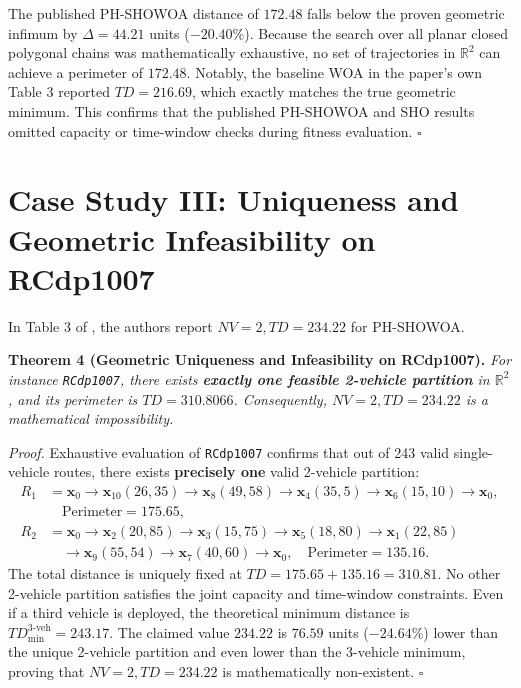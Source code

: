 \documentclass[review]{elsarticle}
\begin{document}
The published PH-SHOWOA distance of $172.48$ falls below the proven geometric infimum by $\Delta = 44.21$ units ($-20.40\%$). Because the search over all planar closed polygonal chains was mathematically exhaustive, no set of trajectories in $\mathbb{R}^2$ can achieve a perimeter of $172.48$. Notably, the baseline WOA in the paper's own Table 3 reported $TD = 216.69$, which exactly matches the true geometric minimum. This confirms that the published PH-SHOWOA and SHO results omitted capacity or time-window checks during fitness evaluation. \hfill $\square$

\section{Case Study III: Uniqueness and Geometric Infeasibility on RCdp1007}
\label{sec:rcdp1007}
In Table 3 of \cite{nguyen2026phshowoa}, the authors report $NV = 2, TD = 234.22$ for PH-SHOWOA.

\vspace{0.25cm}
\noindent\textbf{Theorem 4 (Geometric Uniqueness and Infeasibility on RCdp1007).}
\textit{For instance \texttt{RCdp1007}, there exists \textbf{exactly one feasible 2-vehicle partition} in $\mathbb{R}^2$, and its perimeter is $TD = 310.8066$. Consequently, $NV = 2, TD = 234.22$ is a mathematical impossibility.}

\vspace{0.15cm}
\noindent\textit{Proof.}
Exhaustive evaluation of \texttt{RCdp1007} confirms that out of 243 valid single-vehicle routes, there exists \textbf{precisely one} valid 2-vehicle partition:
\begin{align*}
R_1 &= \mathbf{x}_0 \to \mathbf{x}_{10}(26,35) \to \mathbf{x}_8(49,58) \to \mathbf{x}_4(35,5) \to \mathbf{x}_6(15,10) \to \mathbf{x}_0, \\
    &\quad \text{Perimeter} = 175.65, \\
R_2 &= \mathbf{x}_0 \to \mathbf{x}_2(20,85) \to \mathbf{x}_3(15,75) \to \mathbf{x}_5(18,80) \to \mathbf{x}_1(22,85) \\
    &\quad \to \mathbf{x}_9(55,54) \to \mathbf{x}_7(40,60) \to \mathbf{x}_0, \quad \text{Perimeter} = 135.16.
\end{align*}
The total distance is uniquely fixed at $TD = 175.65 + 135.16 = 310.81$. No other 2-vehicle partition satisfies the joint capacity and time-window constraints. Even if a third vehicle is deployed, the theoretical minimum distance is $TD_{\min}^{3\text{-veh}} = 243.17$. The claimed value $234.22$ is $76.59$ units ($-24.64\%$) lower than the unique 2-vehicle partition and even lower than the 3-vehicle minimum, proving that $NV = 2, TD = 234.22$ is mathematically non-existent. \hfill $\square$
\end{document}
